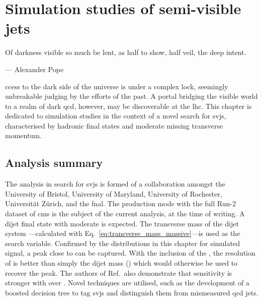 \chapter{Simulation studies of semi-visible jets}
\label{chap:svj}

\epigraph{Of darkness visible so much be lent, as half to show, half veil, the deep intent.}{--- Alexander Pope}

ccess to the dark side of the universe is under a complex lock, seemingly unbreakable judging by the efforts of the past. A portal bridging the visible world to a realm of dark \acrshort{qcd}, however, may be discoverable at the \acrshort{lhc}. This chapter is dedicated to simulation studies in the context of a novel search for \glspl{svj}, characterised by hadronic final states and moderate missing transverse momentum.






\section{Analysis summary}
\label{sec:svj_overview}

The analysis in search for \glspl{svj} is formed of a collaboration amongst the University of Bristol, University of Maryland, University of Rochester, Universit\"{a}t Z\"{u}rich, and the \acrfull{fnal}. The \schannel production mode with the full Run-2 dataset of \acrshort{cms} is the subject of the current analysis, at the time of writing. A dijet final state with moderate \ptmiss is expected. The transverse mass of the dijet system \mT---calculated with Eq.~\ref{eq:transverse_mass_massive}---is used as the search variable. Confirmed by the distributions in this chapter for simulated signal, a peak close to \mZprime can be captured. With the inclusion of the \ptmiss, the resolution of \mT is better than simply the dijet mass (\mjj) which would otherwise be used to recover the peak. The authors of Ref.~also demonstrate that sensitivity is stronger with \mT over \mjj. Novel techniques are utilised, such as the development of a boosted decision tree to tag \glspl{svj} and distinguish them from mismeasured \acrshort{qcd} \glspl{jet}. %

